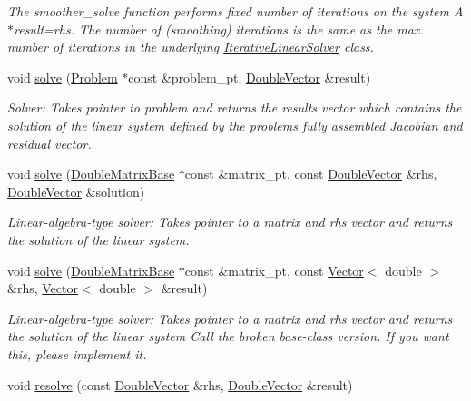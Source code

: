 \begin{DoxyCompactItemize}
\begin{DoxyCompactList}\small\item\em The smoother\+\_\+solve function performs fixed number of iterations on the system A$\ast$result=rhs. The number of (smoothing) iterations is the same as the max. number of iterations in the underlying \hyperlink{classoomph_1_1IterativeLinearSolver}{Iterative\+Linear\+Solver} class. \end{DoxyCompactList}\item 
void \hyperlink{classoomph_1_1GS_ad7d1bfb3d25a194d2875e266e104dc9f}{solve} (\hyperlink{classoomph_1_1Problem}{Problem} $\ast$const \&problem\+\_\+pt, \hyperlink{classoomph_1_1DoubleVector}{Double\+Vector} \&result)
\begin{DoxyCompactList}\small\item\em Solver\+: Takes pointer to problem and returns the results vector which contains the solution of the linear system defined by the problem\textquotesingle{}s fully assembled Jacobian and residual vector. \end{DoxyCompactList}\item 
void \hyperlink{classoomph_1_1GS_a889f33af686aab8649b5ef68bf061681}{solve} (\hyperlink{classoomph_1_1DoubleMatrixBase}{Double\+Matrix\+Base} $\ast$const \&matrix\+\_\+pt, const \hyperlink{classoomph_1_1DoubleVector}{Double\+Vector} \&rhs, \hyperlink{classoomph_1_1DoubleVector}{Double\+Vector} \&solution)
\begin{DoxyCompactList}\small\item\em Linear-\/algebra-\/type solver\+: Takes pointer to a matrix and rhs vector and returns the solution of the linear system. \end{DoxyCompactList}\item 
void \hyperlink{classoomph_1_1GS_a7fb932f50b127b44208c0dee295e6bd8}{solve} (\hyperlink{classoomph_1_1DoubleMatrixBase}{Double\+Matrix\+Base} $\ast$const \&matrix\+\_\+pt, const \hyperlink{classoomph_1_1Vector}{Vector}$<$ double $>$ \&rhs, \hyperlink{classoomph_1_1Vector}{Vector}$<$ double $>$ \&result)
\begin{DoxyCompactList}\small\item\em Linear-\/algebra-\/type solver\+: Takes pointer to a matrix and rhs vector and returns the solution of the linear system Call the broken base-\/class version. If you want this, please implement it. \end{DoxyCompactList}\item 
void \hyperlink{classoomph_1_1GS_af47ff132824a557b738f3d4ad12d5094}{resolve} (const \hyperlink{classoomph_1_1DoubleVector}{Double\+Vector} \&rhs, \hyperlink{classoomph_1_1DoubleVector}{Double\+Vector} \&result)

\end{DoxyCompactItemize}
